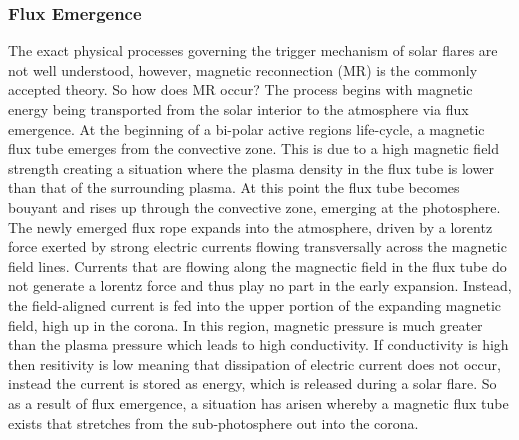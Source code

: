 \subsubsection{Flux Emergence}\label{flux-emerge}
The exact physical processes governing the trigger mechanism of solar flares are not well understood, however, magnetic reconnection (MR) is the commonly accepted theory. So how does MR occur? The process begins with magnetic energy being transported from the solar interior to the atmosphere via flux emergence. At the beginning of a bi-polar active regions life-cycle, a magnetic flux tube emerges from the convective zone. This is due to a high magnetic field strength creating a situation where the plasma density in the flux tube is lower than that of the surrounding plasma. At this point the flux tube becomes bouyant and rises up through the convective zone, emerging at the photosphere. The newly emerged flux rope expands into the atmosphere, driven by a lorentz force exerted by strong electric currents flowing transversally across the magnetic field lines. Currents that are flowing along the magnectic field in the flux tube do not generate a lorentz force and thus play no part in the early expansion. Instead, the field-aligned current is fed into the upper portion of the expanding magnetic field, high up in the corona. In this region, magnetic pressure is much greater than the plasma pressure which leads to high conductivity. If conductivity is high then resitivity is low meaning that dissipation of electric current does not occur, instead the current is stored as energy, which is released during a solar flare. So as a result of flux emergence, a situation has arisen whereby a magnetic flux tube exists that stretches from the sub-photosphere out into the corona. 

